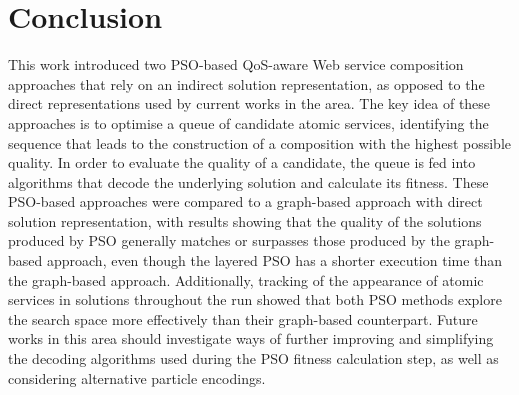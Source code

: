 \documentclass{llncs}
\begin{document}
\section{Conclusion}\label{conclusion}

This work introduced two PSO-based QoS-aware Web service composition approaches that rely on an indirect solution representation, as opposed to the direct representations used by current works in the area. The key idea of these approaches is to optimise a queue of candidate atomic services, identifying the sequence that leads to the construction of a composition with the highest possible quality. In order to evaluate the quality of a candidate, the queue is fed into algorithms that decode the underlying solution and calculate its fitness. These PSO-based approaches were compared to a graph-based approach with direct solution representation, with results showing that the quality of the solutions produced by PSO generally matches or surpasses those produced by the graph-based approach, even though the layered PSO has a shorter execution time than the graph-based approach. Additionally, tracking of the appearance of atomic services in solutions throughout the run showed that both PSO methods explore the search space more effectively than their graph-based counterpart. Future works in this area should investigate ways of further improving and simplifying the decoding algorithms used during the PSO fitness calculation step, as well as considering alternative particle encodings.



\end{document}
